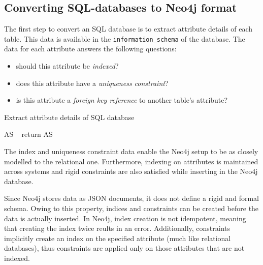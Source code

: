 \documentclass[12pt]{article}
\begin{document}
    \subsection{Converting SQL-databases to Neo4j format}
    The first step to convert an SQL database is to extract attribute details of each table. This data is available in the \verb|information_schema| of the database. The data for each attribute answers the following questions:
    \begin{itemize}
        \item should this attribute be \textit{indexed}?
        \item does this attribute have a \textit{uniqueness constraint}?
        \item is this attribute a \textit{foreign key reference} to another table's attribute?
    \end{itemize}

    \begin{algorithm}[htb!]
        \SetAlgoLined
        \caption{Extract attribute details of SQL database}
        AS \gets\ \phi{}
        return AS\;
        \label{algo:sql_attr_set}
    \end{algorithm}

    The index and uniqueness constraint data enable the Neo4j setup to be as closely modelled to the relational one. Furthermore, indexing on attributes is maintained across systems and rigid constraints are also satisfied while inserting in the Neo4j database.

    Since Neo4j stores data as JSON documents, it does not define a rigid and formal schema. Owing to this property, indices and constraints can be created before the data is actually inserted. In Neo4j, index creation is not idempotent, meaning that creating the index twice reults in an error. Additionally, constraints implicitly create an index on the specified attribute (much like relational databases), thus constraints are applied only on those attributes that are not indexed.
\end{document}
